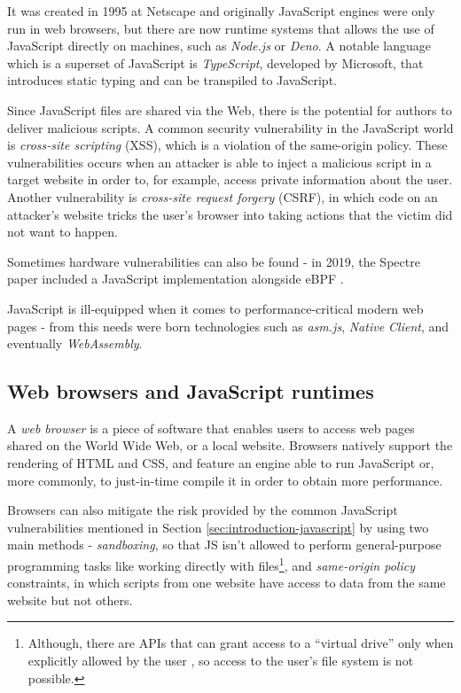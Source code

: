 It was created in 1995 at Netscape and originally JavaScript engines were only run in web browsers, but there
are now runtime systems that allows the use of JavaScript directly on machines, such as \textit{Node.js} or \textit{Deno}.
A notable language which is a superset of JavaScript is \textit{TypeScript}, developed by Microsoft, that
introduces static typing and can be transpiled to JavaScript.

Since JavaScript files are shared via the Web, there is the potential for authors to deliver
malicious scripts.
A common security vulnerability in the JavaScript world is \textit{cross-site scripting} (XSS), which is a violation of the
same-origin policy. These vulnerabilities occurs when an attacker is able to inject a malicious script in a target website
in order to, for example, access private information about the user.
Another vulnerability is \textit{cross-site request forgery} (CSRF), in which code on an attacker's website tricks the user's
browser into taking actions that the victim did not want to happen.

Sometimes hardware vulnerabilities can also be found - in 2019, the Spectre paper included a JavaScript implementation
alongside eBPF \cite{spectre}.

JavaScript is ill-equipped when it comes to performance-critical modern web pages - from this needs were born technologies
such as \textit{asm.js}, \textit{Native Client}, and eventually \textit{WebAssembly}.

\subsection{Web browsers and JavaScript runtimes}

A \textit{web browser} is a piece of software that enables users to access web pages shared on the World Wide Web, or a
local website. Browsers natively support the rendering of HTML and CSS, and feature an engine able to run JavaScript or, more commonly,
to just-in-time compile it in order to obtain more performance.

Browsers can also mitigate the risk provided by the common JavaScript vulnerabilities mentioned in Section \ref{sec:introduction-javascript}
by using two main methods - \textit{sandboxing}, so that JS isn't allowed to perform general-purpose
programming tasks like working directly with files\footnote{Although, there are APIs that can grant access to a ``virtual drive''
only when explicitly allowed by the user \cite{filesystem-mdn}, so access to the user's file system is not possible.},
and \textit{same-origin policy} constraints, in which scripts from one website have access to data from the same website but not others.

